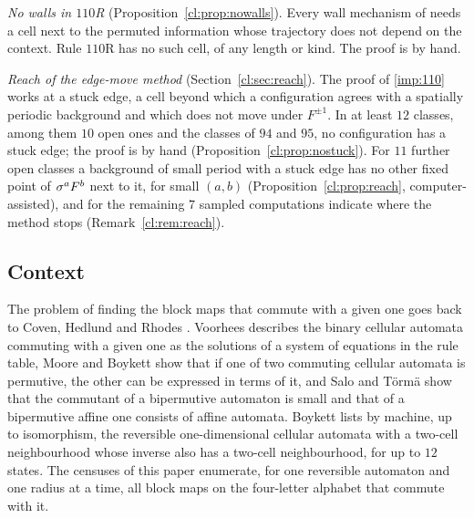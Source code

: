 \emph{No walls in $110$R} (Proposition~\ref{cl:prop:nowalls}). Every wall mechanism of \cite{PaperC} needs a cell next to the permuted information whose trajectory does not depend on the context. Rule $110$R has no such cell, of any length or kind. The proof is by hand.

\emph{Reach of the edge-move method} (Section~\ref{cl:sec:reach}). The proof of \eqref{imp:110} works at a stuck edge, a cell beyond which a configuration agrees with a spatially periodic background and which does not move under $F^{\pm1}$. In at least $12$ classes, among them $10$ open ones and the classes of $94$ and $95$, no configuration has a stuck edge; the proof is by hand (Proposition~\ref{cl:prop:nostuck}). For $11$ further open classes a background of small period with a stuck edge has no other fixed point of $\sigma^aF^b$ next to it, for small $(a,b)$ (Proposition~\ref{cl:prop:reach}, computer-assisted), and for the remaining $7$ sampled computations indicate where the method stops (Remark~\ref{cl:rem:reach}).

\subsection{Context}
The problem of finding the block maps that commute with a given one goes back to Coven, Hedlund and Rhodes \cite{CHR1979}. Voorhees \cite{Voorhees1993} describes the binary cellular automata commuting with a given one as the solutions of a system of equations in the rule table, Moore and Boykett \cite{MooreBoykett1997} show that if one of two commuting cellular automata is permutive, the other can be expressed in terms of it, and Salo and T\"orm\"a \cite{SaloTorma2013} show that the commutant of a bipermutive automaton is small and that of a bipermutive affine one consists of affine automata. Boykett \cite{Boykett2004} lists by machine, up to isomorphism, the reversible one-dimensional cellular automata with a two-cell neighbourhood whose inverse also has a two-cell neighbourhood, for up to $12$ states. The censuses of this paper enumerate, for one reversible automaton and one radius at a time, all block maps on the four-letter alphabet that commute with it.


